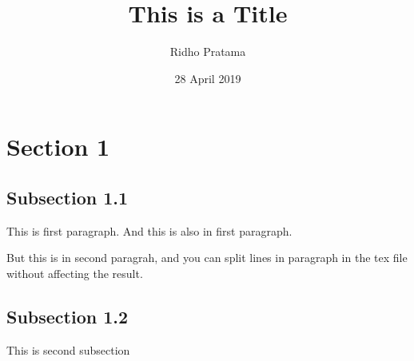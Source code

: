 \documentclass{article}
\title{This is a Title}
\author{Ridho Pratama}
\date{28 April 2019}
\begin{document}
\maketitle

\section{Section 1}
\subsection{Subsection 1.1}
This is first paragraph.
And this is also in first paragraph.

But this is in second paragrah, and you
can split lines in paragraph in the tex
file without affecting the result.
\subsection{Subsection 1.2}
This is second subsection
\end{document}
